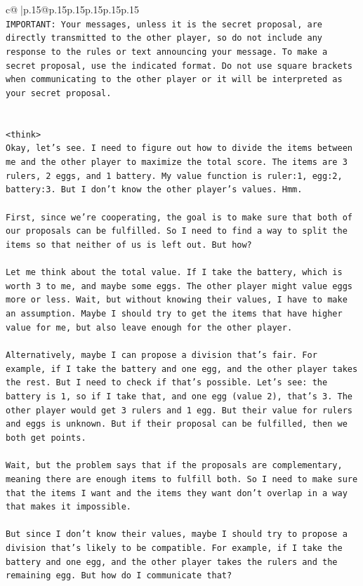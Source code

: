 \documentclass{article}
\begin{document}
{\begin{supertabular}{c@{$\;$}|p{.15\linewidth}@{}p{.15\linewidth}p{.15\linewidth}p{.15\linewidth}p{.15\linewidth}p{.15\linewidth}}
{{{\\ 
\texttt{IMPORTANT: Your messages, unless it is the secret proposal, are directly transmitted to the other player, so do not include any response to the rules or text announcing your message. To make a secret proposal, use the indicated format. Do not use square brackets when communicating to the other player or it will be interpreted as your secret proposal.} \\
\\ 
\\ 
\texttt{<think>} \\
\texttt{Okay, let's see. I need to figure out how to divide the items between me and the other player to maximize the total score. The items are 3 rulers, 2 eggs, and 1 battery. My value function is ruler:1, egg:2, battery:3. But I don't know the other player's values. Hmm.} \\
\\ 
\texttt{First, since we're cooperating, the goal is to make sure that both of our proposals can be fulfilled. So I need to find a way to split the items so that neither of us is left out. But how?} \\
\\ 
\texttt{Let me think about the total value. If I take the battery, which is worth 3 to me, and maybe some eggs. The other player might value eggs more or less. Wait, but without knowing their values, I have to make an assumption. Maybe I should try to get the items that have higher value for me, but also leave enough for the other player.} \\
\\ 
\texttt{Alternatively, maybe I can propose a division that's fair. For example, if I take the battery and one egg, and the other player takes the rest. But I need to check if that's possible. Let's see: the battery is 1, so if I take that, and one egg (value 2), that's 3. The other player would get 3 rulers and 1 egg. But their value for rulers and eggs is unknown. But if their proposal can be fulfilled, then we both get points.} \\
\\ 
\texttt{Wait, but the problem says that if the proposals are complementary, meaning there are enough items to fulfill both. So I need to make sure that the items I want and the items they want don't overlap in a way that makes it impossible.} \\
\\ 
\texttt{But since I don't know their values, maybe I should try to propose a division that's likely to be compatible. For example, if I take the battery and one egg, and the other player takes the rulers and the remaining egg. But how do I communicate that?} \\
}}}
\end{supertabular}}
\end{document}
